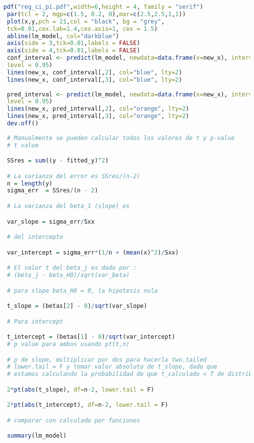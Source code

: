 \documentclass[letterpaper,12pt]{article}
\begin{document}
\begin{lstlisting}[language=R]
 pdf("reg_ci_pi.pdf",width=6,height = 4, family = "serif")
 par(tcl = 2, mgp=c(1.5, 0.2, 0),mar=c(2.5,2.5,1,1))
 plot(x,y,pch = 21,col = "black", bg = "grey",
 tck=0.01,cex.lab=1.4,cex.axis=1, cex = 1.5)
 abline(lm_model, col="darkblue")
 axis(side = 3,tck=0.01,labels = FALSE)
 axis(side = 4,tck=0.01,labels = FALSE)
 conf_interval <- predict(lm_model, newdata=data.frame(x=new_x), interval="confidence",
 level = 0.95)
 lines(new_x, conf_interval[,2], col="blue", lty=2)
 lines(new_x, conf_interval[,3], col="blue", lty=2)
 
 pred_interval <- predict(lm_model, newdata=data.frame(x=new_x), interval="prediction",
 level = 0.95)
 lines(new_x, pred_interval[,2], col="orange", lty=2)
 lines(new_x, pred_interval[,3], col="orange", lty=2)
 dev.off()
 
 # Manualmente se pueden calcular todos los valores de t y p-value
 # t value

 SSres = sum((y - fitted_y)^2)

 # La varianza del error es SSres/(n-2)
 n = length(y)
 sigma_err  = SSres/(n - 2)

 # La varianza del beta_1 (slope) es

 var_slope = sigma_err/Sxx

 # del intercepto

 var_intercept = sigma_err*(1/n + (mean(x)^2)/Sxx)

 # El valor t del beta_j es dado por :
 # (beta_j - beta_H0)/sqrt(var_beta)

 # para slope beta_H0 = 0, la hipotesis nula

 t_slope = (betas[2] - 0)/sqrt(var_slope)

 # Para intercept

 t_intercept = (betas[1] - 0)/sqrt(var_intercept)
 # p value para ambos usando pt(t,n)

 # p de slope, multiplicar por dos para hacerla two.tailed
 # lower.tail = F y tomar valor absoluto de t_slope, dado que
 # estamos calculando la probabilidad de que t_calculado < T de distribucion

 2*pt(abs(t_slope), df=n-2, lower.tail = F)

 2*pt(abs(t_intercept), df=n-2, lower.tail = F)

 # comparar con calculado por funciones

 summary(lm_model)

\end{lstlisting}




\end{document}
